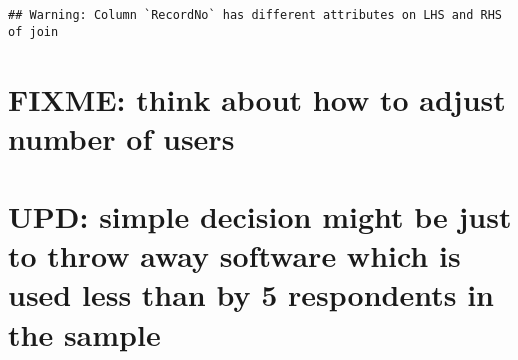 \documentclass[]{article}
\newenvironment{Shaded}{\begin{snugshade}}{\end{snugshade}}
\newcommand{\KeywordTok}[1]{\textcolor[rgb]{0.13,0.29,0.53}{\textbf{{#1}}}}
\newcommand{\DataTypeTok}[1]{\textcolor[rgb]{0.13,0.29,0.53}{{#1}}}
\newcommand{\DecValTok}[1]{\textcolor[rgb]{0.00,0.00,0.81}{{#1}}}
\newcommand{\StringTok}[1]{\textcolor[rgb]{0.31,0.60,0.02}{{#1}}}
\newcommand{\CommentTok}[1]{\textcolor[rgb]{0.56,0.35,0.01}{\textit{{#1}}}}
\newcommand{\NormalTok}[1]{{#1}}
\begin{document}
\begin{verbatim}
## Warning: Column `RecordNo` has different attributes on LHS and RHS of join
\end{verbatim}

\begin{Shaded}
\end{Shaded}

\section{FIXME: think about how to adjust number of
users}\label{fixme-think-about-how-to-adjust-number-of-users}

\section{UPD: simple decision might be just to throw away software which
is used less than by 5 respondents in the
sample}\label{upd-simple-decision-might-be-just-to-throw-away-software-which-is-used-less-than-by-5-respondents-in-the-sample}

\begin{Shaded}
\end{Shaded}
\end{document}
